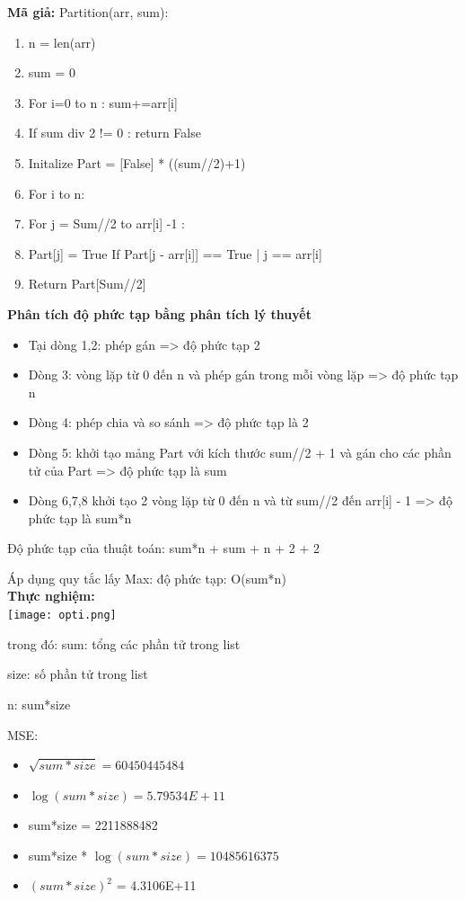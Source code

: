 \documentclass[12pt, letterpaper]{article}
\begin{document}
\textbf{Mã giả:} 
Partition(arr, sum):
\begin{enumerate}
    \item n = len(arr)
    \item sum = 0
    \item For i=0 to n : sum+=arr[i]
    \item If sum div 2 != 0 : return False 
    \item Initalize Part = [False] * ((sum//2)+1)
    \item \setlength{\itemindent}{40pt} For i to n:
   \item \setlength{\itemindent}{80pt}  For j =  Sum//2 to arr[i] -1 :
      
      \item  \setlength{\itemindent}{1500pt}Part[j] = True If Part[j - arr[i]] == True | j == arr[i]
       \item \noindent Return Part[Sum//2]
\end{enumerate}
\textbf{Phân tích độ phức tạp bằng phân tích lý thuyết}
\begin{itemize}
    \item Tại dòng 1,2: phép gán => độ phức tạp 2
    \item Dòng 3: vòng lặp từ 0 đến n và phép gán trong mỗi vòng lặp => độ phức tạp n
    \item Dòng 4: phép chia và so sánh => độ phức tạp là 2
    \item Dòng 5: khởi tạo mảng Part với kích thước sum//2 + 1 và gán cho các phần tử của Part => độ phức tạp là sum
    \item Dòng 6,7,8 khởi tạo 2 vòng lặp từ 0 đến n và từ sum//2 đến arr[i] - 1 => độ phức tạp là sum*n
\end{itemize}
Độ phức tạp của thuật toán: sum*n + sum + n + 2 + 2

Áp dụng quy tắc lấy Max: độ phức tạp: O(sum*n)\\
\textbf{Thực nghiệm:}\\
\noindent \texttt{[image: opti.png]}

trong đó: sum: tổng các phần tử trong list

          size: số phần tử trong list
          
          n: sum*size
          
MSE: 
\begin{itemize}
    \item $\sqrt{sum*size} = 60450445484$
    \item $\log{(sum*size)} = 5.79534E+11$
    \item sum*size = 2211888482
    \item sum*size * $\log{(sum*size)} = 10485616375$
    \item \((sum*size)^2\) = 4.3106E+11
\end{itemize}
\end{document}
